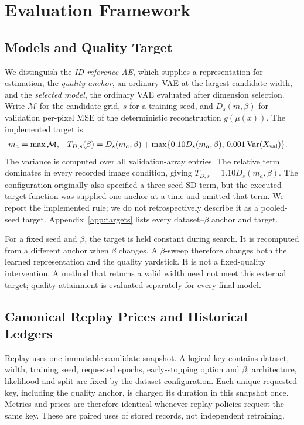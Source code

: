 \documentclass[make,article,submit,pdftex,moreauthors]{Definitions/mdpi}
\begin{document}
\section{Evaluation Framework}\label{sec:framework}

\subsection{Models and Quality Target}\label{sec:quality}
We distinguish the \emph{ID-reference AE}, which supplies a representation
for estimation, the \emph{quality anchor}, an ordinary VAE at the largest
candidate width, and the \emph{selected model}, the ordinary VAE evaluated
after dimension selection. Write $\mathcal M$ for the candidate grid,
$s$ for a training seed, and $D_s(m,\beta)$ for validation per-pixel MSE
of the deterministic reconstruction $g(\mu(x))$. The implemented target is
\begin{align}
 m_a&=\max\mathcal M, &
 T_{D,s}(\beta)&=D_s(m_a,\beta)
 +\max\{0.10D_s(m_a,\beta),\,0.001\operatorname{Var}(X_{\rm val})\}.
 \label{eq:target}
\end{align}
The variance is computed over all validation-array entries. The relative
term dominates in every recorded image condition, giving
$T_{D,s}=1.10D_s(m_a,\beta)$. The configuration originally also specified a
three-seed-SD term, but the executed target function was supplied one
anchor at a time and omitted that term. We report the implemented rule;
we do not retrospectively describe it as a pooled-seed target.
Appendix~\ref{app:targets} lists every dataset--$\beta$ anchor and target.

For a fixed seed and $\beta$, the target is held constant during search.
It is recomputed from a different anchor when $\beta$ changes. A
$\beta$-sweep therefore changes both the learned representation and the
quality yardstick. It is not a fixed-quality intervention. A method that
returns a valid width need not meet this external target; quality
attainment is evaluated separately for every final model.

\subsection{Canonical Replay Prices and Historical Ledgers}\label{sec:cost}
Replay uses one immutable candidate snapshot. A logical key contains
dataset, width, training seed, requested epochs, early-stopping option and
$\beta$; architecture, likelihood and split are fixed by the dataset
configuration. Each unique requested key, including the quality anchor,
is charged its duration in this snapshot once. Metrics and prices are
therefore identical whenever replay policies request the same key.
These are paired uses of stored records, not independent retraining.
\end{document}
